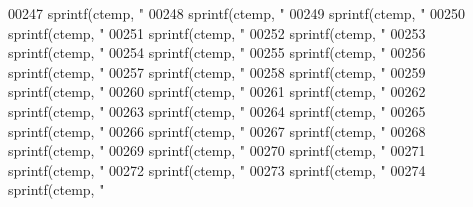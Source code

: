 \begin{DoxyCode}
{{{{{{{{{{{{{{{{{{{{{{{{{{{{{{{{{{{{{{{{{{{{{{{{{{{{{{{{{{{{{{{{{{{{{{{{{{{{{{{{{{{{{{{{{{{{{{{{{{{{{{{{{{{00247     sprintf(ctemp, \textcolor{stringliteral}{"%
00248     sprintf(ctemp, \textcolor{stringliteral}{"%
00249     sprintf(ctemp, \textcolor{stringliteral}{"%
00250     sprintf(ctemp, \textcolor{stringliteral}{"%
00251     sprintf(ctemp, \textcolor{stringliteral}{"%
00252     sprintf(ctemp, \textcolor{stringliteral}{"%
00253     sprintf(ctemp, \textcolor{stringliteral}{"%
00254     sprintf(ctemp, \textcolor{stringliteral}{"%
00255     sprintf(ctemp, \textcolor{stringliteral}{"%
00256     sprintf(ctemp, \textcolor{stringliteral}{"%
00257     sprintf(ctemp, \textcolor{stringliteral}{"%
00258     sprintf(ctemp, \textcolor{stringliteral}{"%
00259     sprintf(ctemp, \textcolor{stringliteral}{"%
00260     sprintf(ctemp, \textcolor{stringliteral}{"%
00261     sprintf(ctemp, \textcolor{stringliteral}{"%
00262     sprintf(ctemp, \textcolor{stringliteral}{"%
00263     sprintf(ctemp, \textcolor{stringliteral}{"%
00264     sprintf(ctemp, \textcolor{stringliteral}{"%
00265     sprintf(ctemp, \textcolor{stringliteral}{"%
00266     sprintf(ctemp, \textcolor{stringliteral}{"%
00267     sprintf(ctemp, \textcolor{stringliteral}{"%
00268     sprintf(ctemp, \textcolor{stringliteral}{"%
00269     sprintf(ctemp, \textcolor{stringliteral}{"%
00270     sprintf(ctemp, \textcolor{stringliteral}{"%
00271     sprintf(ctemp, \textcolor{stringliteral}{"%
00272     sprintf(ctemp, \textcolor{stringliteral}{"%
00273     sprintf(ctemp, \textcolor{stringliteral}{"%
00274     sprintf(ctemp, \textcolor{stringliteral}{"%
}}}}}}}}}}}}}}}}}}}}}}}}}}}}}}}}}}}}}}}}}}}}}}}}}}}}}}}}}}}}}}}}}}}}}}}}}}}}}}}}}}}}}}}}}}}}}}}}}}}}}}}}}}}}}}}}}}}}}}}}}}}}}}}}}}}}}}}
\end{DoxyCode}

